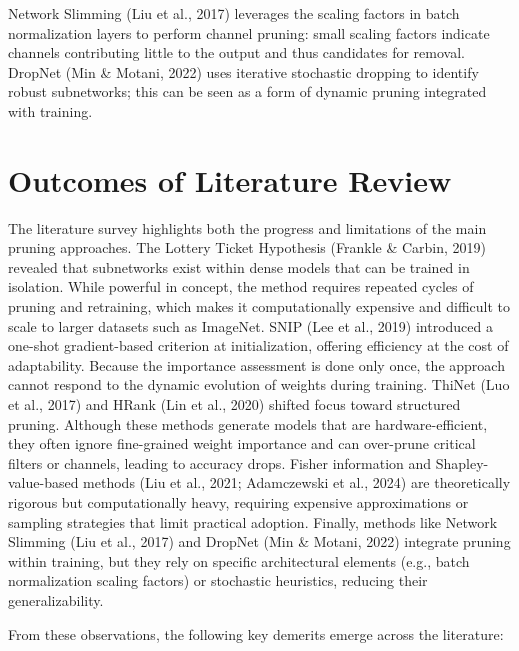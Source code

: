 \documentclass[12pt,a4paper]{report}
\begin{document}
Network Slimming (Liu et al., 2017) leverages the scaling factors in batch normalization layers to perform channel pruning: small scaling factors indicate channels contributing little to the output and thus candidates for removal. DropNet (Min \& Motani, 2022) uses iterative stochastic dropping to identify robust subnetworks; this can be seen as a form of dynamic pruning integrated with training.

\clearpage

\section{Outcomes of Literature Review}
The literature survey highlights both the progress and limitations of the main pruning approaches.  
The Lottery Ticket Hypothesis (Frankle \& Carbin, 2019) revealed that subnetworks exist within dense models that can be trained in isolation. While powerful in concept, the method requires repeated cycles of pruning and retraining, which makes it computationally expensive and difficult to scale to larger datasets such as ImageNet.  
SNIP (Lee et al., 2019) introduced a one-shot gradient-based criterion at initialization, offering efficiency at the cost of adaptability. Because the importance assessment is done only once, the approach cannot respond to the dynamic evolution of weights during training.  
ThiNet (Luo et al., 2017) and HRank (Lin et al., 2020) shifted focus toward structured pruning. Although these methods generate models that are hardware-efficient, they often ignore fine-grained weight importance and can over-prune critical filters or channels, leading to accuracy drops.  
Fisher information and Shapley-value-based methods (Liu et al., 2021; Adamczewski et al., 2024) are theoretically rigorous but computationally heavy, requiring expensive approximations or sampling strategies that limit practical adoption.  
Finally, methods like Network Slimming (Liu et al., 2017) and DropNet (Min \& Motani, 2022) integrate pruning within training, but they rely on specific architectural elements (e.g., batch normalization scaling factors) or stochastic heuristics, reducing their generalizability.

From these observations, the following key demerits emerge across the literature:
\end{document}
